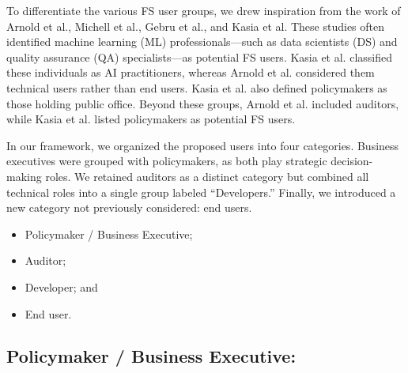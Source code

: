 \documentclass[manuscript,screen,review]{acmart}
\begin{document}
	To differentiate the various FS user groups, we drew inspiration from the work of Arnold et al., Michell et al., Gebru et al., and Kasia et al. These studies often identified machine learning (ML) professionals—such as data scientists (DS) and quality assurance (QA) specialists—as potential FS users. Kasia et al. classified these individuals as AI practitioners, whereas Arnold et al. considered them technical users rather than end users. Kasia et al. also defined policymakers as those holding public office. Beyond these groups, Arnold et al. included auditors, while Kasia et al. listed policymakers as potential FS users.

	In our framework, we organized the proposed users into four categories. Business executives were grouped with policymakers, as both play strategic decision-making roles. We retained auditors as a distinct category but combined all technical roles into a single group labeled “Developers.” Finally, we introduced a new category not previously considered: end users.



	\begin{itemize}
		\item Policymaker / Business Executive;
		\item Auditor;
		\item Developer; and
		\item End user.
	\end{itemize}

\subsection{Policymaker / Business Executive:}

	
\end{document}
